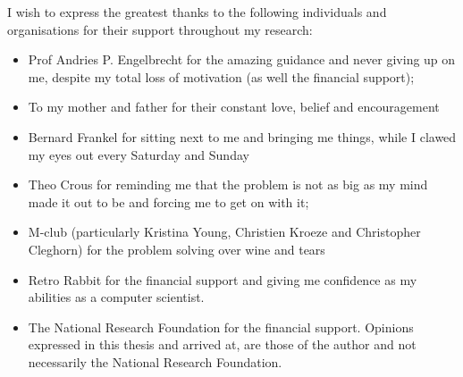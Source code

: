\noindent I wish to express the greatest thanks to the following individuals and organisations for their support throughout my research:
\begin{itemize}
	\item Prof Andries P. Engelbrecht for the amazing guidance and never giving up on me, despite my total loss of motivation (as well the financial support);
	\item To my mother and father for their constant love, belief and encouragement
	\item Bernard Frankel for sitting next to me and bringing me things, while I clawed my eyes out every Saturday and Sunday
	\item Theo Crous for reminding me that the problem is not as big as my mind made it out to be and forcing me to get on with it;
	\item M-club (particularly Kristina Young, Christien Kroeze and Christopher Cleghorn) for the problem solving over wine and tears
	\item Retro Rabbit for the financial support and giving me confidence as my abilities as a computer scientist.
	\item The National Research Foundation for the financial support. Opinions expressed in this thesis and arrived at, are those of the author and not necessarily the National Research Foundation.
\end{itemize}


\cleardoublepage
\pagestyle{plain}
\setcounter{page}{1}
\ifpdf
{}
\fi
\tableofcontents


\cleardoublepage
\ifpdf
{}
\fi
{}
\listoffigures




\cleardoublepage
\ifpdf
{}
\fi
{}


\cleardoublepage
\ifpdf
{}
\fi
{}
\listoftables

